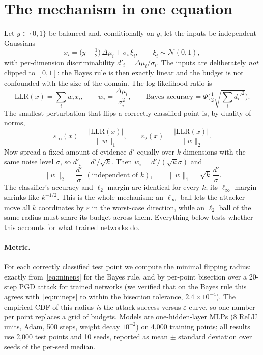 \documentclass[11pt]{article}
\newcommand{\linf}{\ell_\infty}
\newcommand{\ltwo}{\ell_2}
\newcommand{\epsinf}{\varepsilon_\infty}
\newcommand{\epstwo}{\varepsilon_2}
\begin{document}
\section{The mechanism in one equation}
\label{sec:mechanism}

Let $y\in\{0,1\}$ be balanced and, conditionally on $y$, let the inputs be
independent Gaussians
\[
x_i = \big(y-\tfrac12\big)\,\Delta\mu_i + \sigma_i\,\xi_i,\qquad \xi_i\sim\mathcal N(0,1),
\]
with per-dimension discriminability $d'_i=\Delta\mu_i/\sigma_i$. The inputs are
deliberately \emph{not} clipped to $[0,1]$: the Bayes rule is then exactly
linear and the budget is not confounded with the size of the domain. The
log-likelihood ratio is
\[
\mathrm{LLR}(x)=\sum_i w_i x_i,\qquad w_i=\frac{\Delta\mu_i}{\sigma_i^2},
\qquad \text{Bayes accuracy}=\Phi\!\Big(\tfrac12\sqrt{\textstyle\sum_i d_i'^2}\Big).
\]
The smallest perturbation that flips a correctly classified point is, by
duality of norms,
\begin{equation}
\epsinf(x)=\frac{|\mathrm{LLR}(x)|}{\|w\|_1},\qquad
\epstwo(x)=\frac{|\mathrm{LLR}(x)|}{\|w\|_2}.
\label{eq:mineps}
\end{equation}
Now spread a fixed amount of evidence $d'$ equally over $k$ dimensions with
the same noise level $\sigma$, so $d'_i=d'/\sqrt k$. Then $w_i=d'/(\sqrt k\sigma)$
and
\begin{equation}
\|w\|_2=\frac{d'}{\sigma}\ \ (\text{independent of }k),\qquad
\|w\|_1=\sqrt k\,\frac{d'}{\sigma}.
\label{eq:norms}
\end{equation}
The classifier's accuracy and $\ltwo$ margin are identical for every $k$; its
$\linf$ margin shrinks like $k^{-1/2}$. This is the whole mechanism: an $\linf$
ball lets the attacker move all $k$ coordinates by $\varepsilon$ in the
worst-case direction, while an $\ltwo$ ball of the same radius must share its
budget across them. Everything below tests whether this accounts for what
trained networks do.

\paragraph{Metric.} For each correctly classified test point we compute the
minimal flipping radius: exactly from~\eqref{eq:mineps} for the Bayes rule, and
by per-point bisection over a 20-step PGD attack for trained networks (we
verified that on the Bayes rule this agrees with~\eqref{eq:mineps} to within
the bisection tolerance, $2.4\times10^{-4}$). The empirical CDF of this radius
\emph{is} the attack-success-versus-$\varepsilon$ curve, so one number per point
replaces a grid of budgets. Models are one-hidden-layer MLPs (8 ReLU units,
Adam, 500 steps, weight decay $10^{-2}$) on 4{,}000 training points; all
results use 2{,}000 test points and 10 seeds, reported as mean $\pm$ standard
deviation over seeds of the per-seed median.
\end{document}
